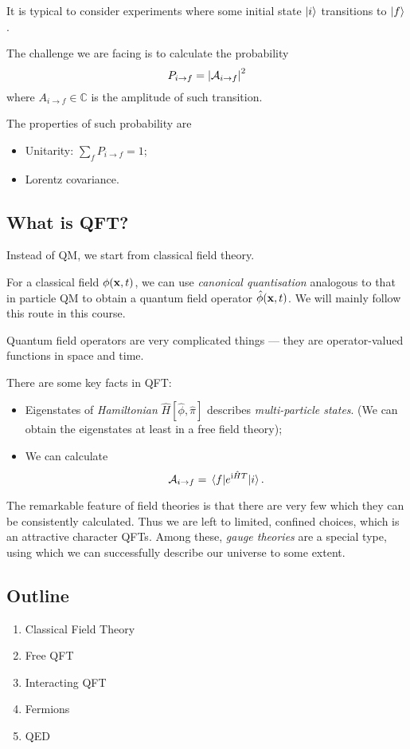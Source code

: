 \documentclass[a4paper,11pt]{article}
\begin{document}
	It is typical to consider experiments where some initial state $\ket{i}$ transitions to $\ket{f}$.
	

	The challenge we are facing is to calculate the probability 
	\[
		P_{i \to f} = \abs{\mathcal{A}_{i \to f}}^2
	\]
	where $A_{i \to f} \in \mathbb{C}$ is the amplitude of such transition.

	The properties of such probability are
	\begin{itemize}
		\item Unitarity: $\sum_f P_{i \to f} = 1$;
		\item Lorentz covariance.
	\end{itemize}

	\subsection*{What is QFT?}
	Instead of QM, we start from classical field theory.

	For a classical field $\phi(\vb x, t)$, we can use \emph{canonical quantisation} analogous to that in particle QM to obtain a quantum field operator $\hat{\phi}(\vb x,t)$. We will mainly follow this route in this course.

	Quantum field operators are very complicated things --- they are operator-valued functions in space and time.

	There are some key facts in QFT:
	\begin{itemize}
		\item Eigenstates of \emph{Hamiltonian} $\hat{H}[\hat{\phi}, \hat{\pi}]$ describes \emph{multi-particle states}. (We can obtain the eigenstates at least in a free field theory);
		\item We can calculate \[
			\mathcal{A}_{i \to f} = \mel{f}{e^{\mathrm{i} \hat{H} T}}{i}.
		\]
	\end{itemize}

	The remarkable feature of field theories is that there are very few which they can be consistently calculated. Thus we are left to limited, confined choices, which is an attractive character QFTs. Among these, \emph{gauge theories} are a special type, using which we can successfully describe our universe to some extent.

	\subsection*{Outline}
	\begin{enumerate}
		\item Classical Field Theory
		\item Free QFT
		\item Interacting QFT
		\item Fermions
		\item QED
	\end{enumerate}
\end{document}
